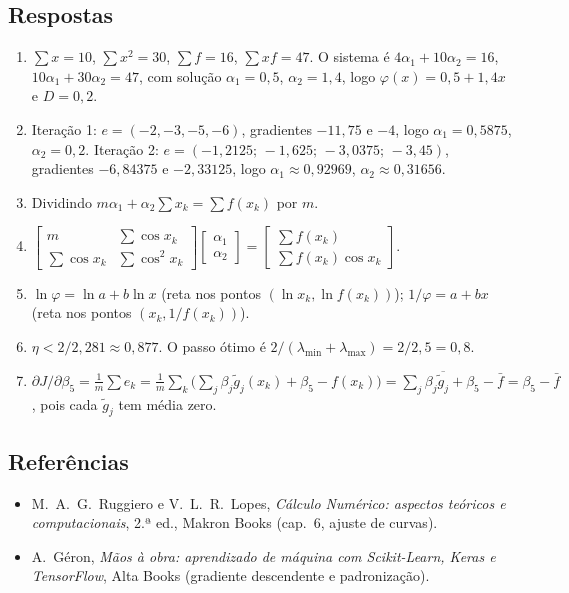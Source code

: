 \subsection*{Respostas}
\begin{enumerate}[label=\arabic*.,nosep]
  \item $\sum x=10$, $\sum x^2=30$, $\sum f=16$, $\sum xf=47$. O sistema é $4\alpha_1+10\alpha_2=16$,
        $10\alpha_1+30\alpha_2=47$, com solução $\alpha_1=0{,}5$, $\alpha_2=1{,}4$, logo $\varphi(x)=0{,}5+1{,}4x$ e $D=0{,}2$.
  \item Iteração 1: $e=(-2,-3,-5,-6)$, gradientes $-11{,}75$ e $-4$, logo $\alpha_1=0{,}5875$, $\alpha_2=0{,}2$.
        Iteração 2: $e=(-1{,}2125;\,-1{,}625;\,-3{,}0375;\,-3{,}45)$, gradientes $-6{,}84375$ e $-2{,}33125$, logo
        $\alpha_1\approx0{,}92969$, $\alpha_2\approx0{,}31656$.
  \item Dividindo $m\alpha_1+\alpha_2\sum x_k=\sum f(x_k)$ por $m$.
  \item $\begin{bmatrix} m & \sum\cos x_k\\ \sum\cos x_k & \sum\cos^2x_k\end{bmatrix}\begin{bmatrix}\alpha_1\\ \alpha_2\end{bmatrix}=\begin{bmatrix}\sum f(x_k)\\ \sum f(x_k)\cos x_k\end{bmatrix}$.
  \item $\ln\varphi=\ln a+b\ln x$ (reta nos pontos $(\ln x_k,\ln f(x_k))$); $1/\varphi=a+bx$ (reta nos pontos $(x_k,1/f(x_k))$).
  \item $\eta<2/2{,}281\approx0{,}877$. O passo ótimo é $2/(\lambda_{\min}+\lambda_{\max})=2/2{,}5=0{,}8$.
  \item $\partial J/\partial\beta_5=\frac1m\sum e_k=\frac1m\sum_k\big(\sum_j\beta_j\tilde g_j(x_k)+\beta_5-f(x_k)\big)
        =\sum_j\beta_j\overline{\tilde g_j}+\beta_5-\bar f=\beta_5-\bar f$, pois cada $\tilde g_j$ tem média zero.
\end{enumerate}

\subsection*{Referências}
\begin{itemize}[nosep]
  \item M.~A.~G.~Ruggiero e V.~L.~R.~Lopes, \emph{Cálculo Numérico: aspectos teóricos e computacionais}, 2.ª ed., Makron Books (cap.~6, ajuste de curvas).
  \item A.~Géron, \emph{Mãos à obra: aprendizado de máquina com Scikit-Learn, Keras e TensorFlow}, Alta Books (gradiente descendente e padronização).
\end{itemize}
